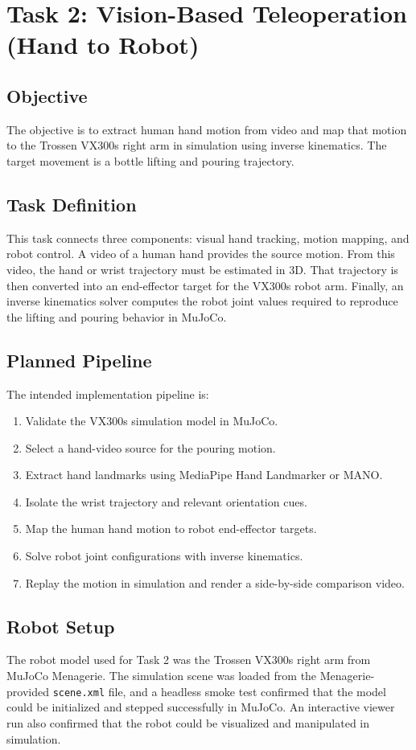\documentclass[11pt,a4paper]{article}
\begin{document}
\newpage
\section{Task 2: Vision-Based Teleoperation (Hand to Robot)}

\subsection{Objective}
The objective is to extract human hand motion from video and map that motion to the Trossen VX300s right arm in simulation using inverse kinematics. The target movement is a bottle lifting and pouring trajectory.

\subsection{Task Definition}
This task connects three components: visual hand tracking, motion mapping, and robot control. A video of a human hand provides the source motion. From this video, the hand or wrist trajectory must be estimated in 3D. That trajectory is then converted into an end-effector target for the VX300s robot arm. Finally, an inverse kinematics solver computes the robot joint values required to reproduce the lifting and pouring behavior in MuJoCo.

\subsection{Planned Pipeline}
The intended implementation pipeline is:

\begin{enumerate}[leftmargin=1.5em]
	\item Validate the VX300s simulation model in MuJoCo.
	\item Select a hand-video source for the pouring motion.
	\item Extract hand landmarks using MediaPipe Hand Landmarker or MANO.
	\item Isolate the wrist trajectory and relevant orientation cues.
	\item Map the human hand motion to robot end-effector targets.
	\item Solve robot joint configurations with inverse kinematics.
	\item Replay the motion in simulation and render a side-by-side comparison video.
\end{enumerate}

\subsection{Robot Setup}
The robot model used for Task 2 was the Trossen VX300s right arm from MuJoCo Menagerie. The simulation scene was loaded from the Menagerie-provided \texttt{scene.xml} file, and a headless smoke test confirmed that the model could be initialized and stepped successfully in MuJoCo. An interactive viewer run also confirmed that the robot could be visualized and manipulated in simulation.
\end{document}
